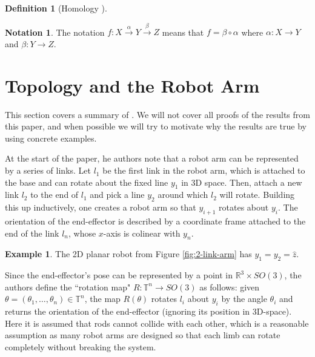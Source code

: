 \documentclass[12pt]{article}
\theoremstyle{definition}
\newtheorem{defn}{Definition}
\newtheorem{example}{Example}
\newtheorem*{notation}{Notation}
\begin{document}
\begin{defn}[Homology \cite{intro-top-manifolds}]

\end{defn}

\begin{notation}
    The notation
    \(f : X \xrightarrow{\alpha} Y \xrightarrow{\beta} Z\)
    means that \(f = \beta \circ \alpha\) where
    \(\alpha : X \rightarrow Y\) and \(\beta : Y \rightarrow Z\).
\end{notation}


\section{Topology and the Robot Arm}
This section covers a summary of \cite{topology-robot-arm}. We will not cover
all proofs of the results from this paper, and when possible we
will try to motivate why the results are true by using concrete examples.

At the start of the paper, he authors note that a robot arm can be represented
by a series of links. Let \(l_1\) be the first link in the robot arm, which is
attached to the base and can rotate about the fixed line \(y_1\) in 3D space.
Then, attach a new link \(l_2\) to the end of \(l_1\) and pick a line \(y_2\)
around which \(l_2\) will rotate. Building this up inductively, one creates a
robot arm so that \(y_{i+1}\) rotates about \(y_i\). The orientation of the
end-effector is described by a coordinate frame attached to the end of the link
\(l_n\), whose \(x\)-axis is colinear with \(y_n\).

\begin{example}
    The 2D planar robot from Figure \ref{fig:2-link-arm} has 
    \(y_1 = y_2 = \hat{z}\).
\end{example}

Since the end-effector's pose can be represented by a point in
\(\mathbb{R}^3\times SO(3)\), the authors define the ``rotation map" 
\(R : \mathbb{T}^n \rightarrow SO(3)\) as follows: 
given \(\theta = (\theta_1,\ldots,\theta_n) \in \mathbb{T}^n\),
the map \(R(\theta)\) rotates \(l_i\) about \(y_i\) by the angle \(\theta_i\)
and returns the orientation of the end-effector (ignoring its position in
3D-space). Here it is assumed that rods cannot collide with each other, which
is a reasonable assumption as many robot arms are designed so that each limb can
rotate completely without breaking the system.
\end{document}
